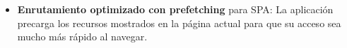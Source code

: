 \documentclass[12pt,twoside,titlepage]{report}
\begin{document}
\begin{itemize}

    \item \textbf{Enrutamiento optimizado con prefetching} para SPA: La aplicación precarga los recursos mostrados en la página actual para que su acceso sea mucho más rápido al navegar. 

\end{itemize}
\end{document}
